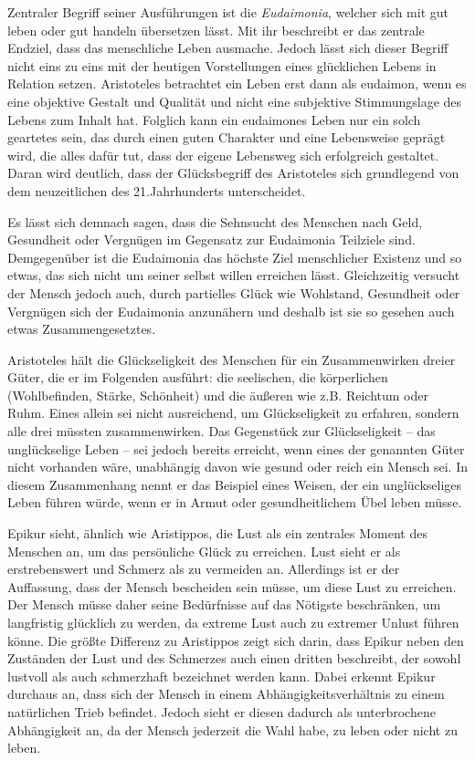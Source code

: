 Zentraler Begriff seiner Ausführungen ist die \textit{Eudaimonia}, welcher sich mit \glqq gut leben\grqq{} oder \glqq gut handeln\grqq{} übersetzen lässt\cite[S.\,5]{MF93}.
Mit ihr beschreibt er das zentrale Endziel, dass das menschliche Leben ausmache. 
Jedoch lässt sich dieser Begriff nicht eins zu eins mit der heutigen Vorstellungen eines glücklichen Lebens in Relation setzen.
Aristoteles betrachtet ein Leben erst dann als eudaimon, wenn es eine \glqq objektive Gestalt und Qualität und nicht eine subjektive Stimmungslage des Lebens zum Inhalt hat.\grqq{} \cite[S.\,5]{MF93}
 Folglich kann ein eudaimones Leben nur ein solch geartetes sein, das durch einen guten Charakter und eine Lebensweise geprägt wird, die alles dafür tut, dass der eigene Lebensweg sich erfolgreich gestaltet. 
 Daran wird deutlich, dass der Glücksbegriff des Aristoteles sich grundlegend von dem neuzeitlichen des 21.Jahrhunderts unterscheidet.
 
Es lässt sich demnach sagen, dass die Sehnsucht des Menschen nach Geld, Gesundheit oder Vergnügen im Gegensatz zur Eudaimonia Teilziele sind. 
Demgegenüber ist die Eudaimonia das höchste Ziel menschlicher Existenz und so etwas, das sich nicht um seiner selbst willen erreichen lässt. 
Gleichzeitig versucht der Mensch jedoch auch, durch partielles Glück wie Wohlstand, Gesundheit oder Vergnügen sich der Eudaimonia anzunähern und deshalb ist sie so gesehen auch etwas Zusammengesetztes. 

Aristoteles hält die Glückseligkeit des Menschen für ein Zusammenwirken dreier Güter, die er im Folgenden ausführt: die seelischen, die körperlichen (Wohlbefinden, Stärke, Schönheit) und die äußeren wie z.B. Reichtum oder Ruhm\cite[S.\,257f]{AD67}.
Eines allein sei nicht ausreichend, um Glückseligkeit zu erfahren, sondern alle drei müssten zusammenwirken. 
Das Gegenstück zur Glückseligkeit -- das unglückselige Leben -- sei jedoch bereits erreicht, wenn eines der genannten Güter nicht vorhanden wäre, unabhängig davon wie gesund oder reich ein Mensch sei. 
In diesem Zusammenhang nennt er das Beispiel eines Weisen, der ein unglückseliges Leben führen würde, wenn er in Armut oder gesundheitlichem Übel leben müsse.

Epikur sieht, ähnlich wie Aristippos, die Lust als ein zentrales Moment des Menschen an, um das persönliche Glück zu erreichen. 
Lust sieht er als erstrebenswert und Schmerz als zu vermeiden an. 
Allerdings ist er der Auffassung, dass der Mensch bescheiden sein müsse, um diese Lust zu erreichen.
Der Mensch müsse daher seine Bedürfnisse auf das Nötigste beschränken, um langfristig glücklich zu werden, da extreme Lust auch zu extremer Unlust führen könne.
Die größte Differenz zu Aristippos zeigt sich darin, dass Epikur neben den Zuständen der Lust und des Schmerzes auch einen dritten beschreibt, der sowohl lustvoll als auch schmerzhaft bezeichnet werden kann\cite[S.\,32]{MF93}. 
Dabei erkennt Epikur durchaus an, dass sich der Mensch in einem Abhängigkeitsverhältnis zu einem natürlichen Trieb befindet. 
Jedoch sieht er diesen dadurch als unterbrochene Abhängigkeit an, da der Mensch jederzeit die Wahl habe, zu leben oder nicht zu leben\cite[S.\,36]{MF93}.

